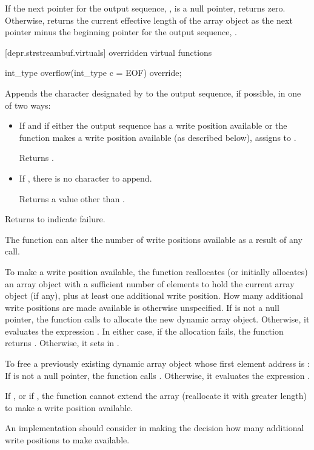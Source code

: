 \begin{itemdescr}
\pnum
\effects
If the next pointer for the output sequence, , is
a null pointer, returns zero.
Otherwise, returns the current
effective length of the array object as the next pointer minus the beginning
pointer for the output sequence, .
\end{itemdescr}

[depr.strstreambuf.virtuals]{ overridden virtual functions}

%
\begin{itemdecl}
int_type overflow(int_type c = EOF) override;
\end{itemdecl}

\begin{itemdescr}
\pnum
\effects
Appends the character designated by  to the output
sequence, if possible, in one of two ways:
\begin{itemize}
\item
If
and if either the output sequence has a write position available or
the function makes a write position available
(as described below),
assigns  to
.

Returns
.

\item
If
,
there is no character to append.

Returns a value other than .
\end{itemize}

\pnum
Returns
to indicate failure.

\pnum
\remarks
The function can alter the number of write positions available as a
result of any call.

\pnum
To make a write position available, the function reallocates
(or initially allocates)
an array object with a sufficient number of elements
 to hold the current array object (if any),
plus at least one additional write position.
How many additional write positions are made
available is otherwise unspecified.%
%
If  is not a null pointer, the function calls
to allocate the new dynamic array object.
Otherwise, it evaluates the expression
.
In either case, if the allocation fails, the function returns
.
Otherwise, it sets  in .

\pnum
To free a previously existing dynamic array object whose first
element address is :
If  is not a null pointer,
the function calls
.
Otherwise, it evaluates the expression .

\pnum
If
,
or if
,
the function cannot extend the array (reallocate it with greater length) to make a write position available.

\pnum
\recommended
An implementation should consider  in making the
decision how many additional write positions to make available.
\end{itemdescr}

